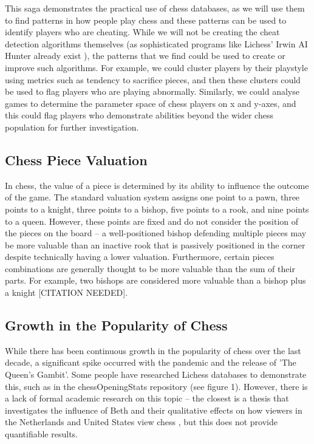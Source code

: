 \documentclass[%
 superscriptaddress,
showpacs,preprintnumbers,
 amsmath,
 amssymb,
 aps,
 pra,
showkeys,
onecolumn,
notitlepage,
11pt,
tightenlines      %
]{revtex4-1}
\begin{document}
This saga demonstrates the practical use of chess databases, as we will use them to find patterns in how people play chess and these patterns can be used to identify players who are cheating. While we will not be creating the cheat detection algorithms themselves (as sophisticated programs like Lichess' Irwin AI Hunter already exist \cite{lichessIrwinCheatDetection}), the patterns that we find could be used to create or improve such algorithms. For example, we could cluster players by their playstyle using metrics such as tendency to sacrifice pieces, and then these clusters could be used to flag players who are playing abnormally. Similarly, we could analyse games to determine the parameter space of chess players on x and y-axes, and this could flag players who demonstrate abilities beyond the wider chess population for further investigation.

\subsection{Chess Piece Valuation}
In chess, the value of a piece is determined by its ability to influence the outcome of the game. The standard valuation system assigns one point to a pawn, three points to a knight, three points to a bishop, five points to a rook, and nine points to a queen. However, these points are fixed and do not consider the position of the pieces on the board -- a well-positioned bishop defending multiple pieces may be more valuable than an inactive rook that is passively positioned in the corner despite technically having a lower valuation. Furthermore, certain pieces combinations are generally thought to be more valuable than the sum of their parts. For example, two bishops are considered more valuable than a bishop plus a knight [CITATION NEEDED].

\subsection{Growth in the Popularity of Chess}
While there has been continuous growth in the popularity of chess over the last decade, a significant spike occurred with the pandemic and the release of 'The Queen's Gambit'. Some people have researched Lichess databases to demonstrate this, such as in the chessOpeningStats repository (see figure 1). However, there is a lack of formal academic research on this topic -- the closest is a thesis that investigates the influence of Beth and their qualitative effects on how viewers in the Netherlands and United States view chess \cite{lowie2021big}, but this does not provide quantifiable results.
\end{document}
